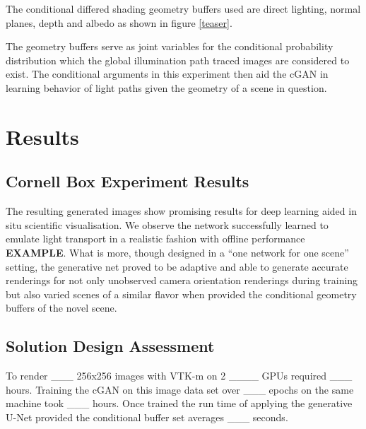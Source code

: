 \documentclass[conference]{IEEEtran}
\begin{document}
The conditional differed shading geometry buffers used are direct lighting, normal planes, depth and albedo as shown in figure \ref{teaser}.

The geometry buffers serve as joint variables for the conditional probability distribution which the global illumination path traced images are considered to exist. The conditional arguments in this experiment then aid the cGAN in learning behavior of light paths given the geometry of a scene in question. 

\section{Results}
\subsection{Cornell Box Experiment Results}
The resulting generated images show promising results for deep learning aided in situ scientific visualisation. We observe the network successfully learned to emulate light transport in a realistic fashion with offline performance {\bf EXAMPLE}. What is more, though designed in a ``one network for one scene'' setting, the generative net proved to be adaptive and able to generate accurate renderings for not only unobserved camera orientation renderings during training but also varied scenes of a similar flavor when provided the conditional geometry buffers of the novel scene. 

\subsection{Solution Design Assessment}

To render \_\_\_ 256x256 images with VTK-m on 2 \_\_\_\_ GPUs required \_\_\_ hours. Training the cGAN on this image data set over \_\_\_ epochs on the same machine took \_\_\_ hours. Once trained the run time of applying the generative U-Net provided the conditional buffer set averages \_\_\_ seconds. 
\end{document}
